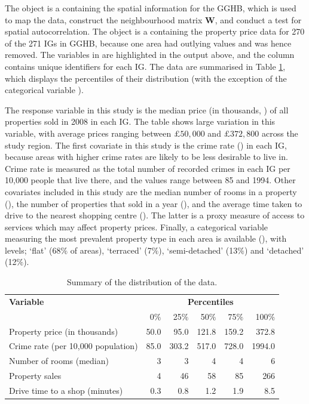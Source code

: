 \documentclass[article,shortnames,nojss]{jss}
\begin{document}
The  object is a  containing the spatial information for the GGHB, which is used to map the data, construct the neighbourhood matrix $\mathbf{W}$, and conduct a test for spatial autocorrelation. The  object is a   containing the property price data for 270 of the 271 IGs in GGHB, because one area had outlying values and was hence removed. The variables in  are highlighted in the output above, and the  column contains unique identifiers for each IG. The data are summarised in Table \ref{table_scotland data}, which displays the percentiles of their distribution (with the exception of the categorical variable ). 

\hspace{1cm}The response variable in this study is the median price (in thousands, ) of all properties sold in 2008 in each IG. The table shows large variation in this variable, with average prices ranging between $\pounds 50,000$ and $\pounds 372,800$ across the study region. The first covariate in this study is the crime rate () in each IG, because areas with higher crime rates are likely to be less desirable to live in. Crime rate is measured as the total number of recorded crimes in each IG per 10,000 people that live there, and the values range between 85 and 1994. Other covariates included in this study are the median number of rooms in a property (), the number of properties that sold in a year (), and the average time taken to drive to the nearest shopping centre (). The latter is a proxy measure of access to services which may affect property prices. Finally, a categorical variable measuring the  most prevalent property type in each area is available (), with levels; `flat' (68$\%$ of areas), `terraced' (7$\%$), `semi-detached' (13$\%$) and `detached' (12$\%$). 

\begin{table}
\centering\begin{tabular}{lrrrrr}
\hline
\textbf{Variable}&\multicolumn{5}{c}{\textbf{Percentiles}}\\
&0$\%$&25$\%$&50$\%$&75$\%$&100$\%$\\\hline
Property price (in thousands)&50.0& 95.0 &121.8 &159.2 &372.8\\
Crime rate (per 10,000 population) &85.0&  303.2&  517.0&  728.0& 1994.0\\
Number of rooms (median)&3 &3 &4 &4 &6 \\
Property sales &4 & 46 & 58 & 85 & 266\\
Drive time to a shop (minutes)&0.3 & 0.8 & 1.2 & 1.9 & 8.5\\\hline
\end{tabular}
\caption{\label{table_scotland data} Summary of the distribution of the data.}
\end{table}
\end{document}
